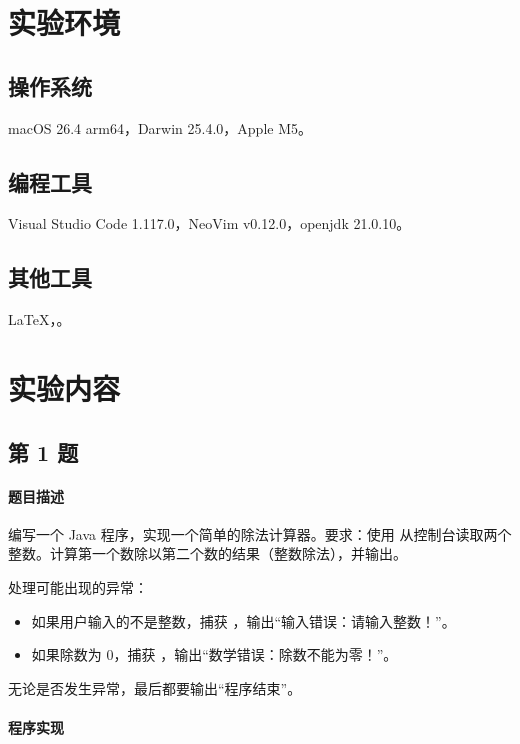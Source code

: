 \documentclass{academics}
\begin{document}
\makeacademicscover

\section{实验环境}

\subsection{操作系统}

macOS 26.4 arm64，Darwin 25.4.0，Apple M5。

\subsection{编程工具}

Visual Studio Code 1.117.0，NeoVim v0.12.0，openjdk 21.0.10。

\subsection{其他工具}

\LaTeX{}，。

\section{实验内容}

\subsection{第 1 题}

\paragraph{题目描述} {
    编写一个 Java 程序，实现一个简单的除法计算器。要求：使用  从控制台读取两个整数。计算第一个数除以第二个数的结果（整数除法），并输出。

    处理可能出现的异常：
    \begin{itemize}
        \item 如果用户输入的不是整数，捕获 ，输出``输入错误：请输入整数！''。
        \item 如果除数为 $0$，捕获 ，输出``数学错误：除数不能为零！''。
    \end{itemize}
    无论是否发生异常，最后都要输出``程序结束''。
}

\paragraph{程序实现} {
    \inputminted[label=DivisionCalculator.java]{java}{../src/P01/DivisionCalculator.java}
}
\end{document}
